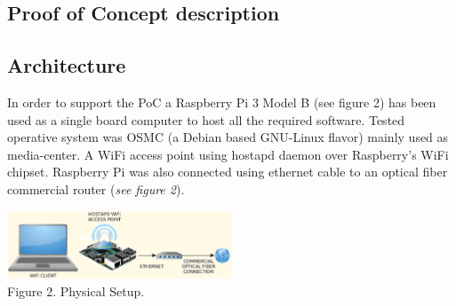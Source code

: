 \documentclass[12pt]{amsart}
\begin{document}
\begin{multicols}{2}



\section{Proof of Concept description}

\subsection{Architecture}
\label{ch:architecture}
\vspace{0.35cm}

In order to support the PoC a
Raspberry Pi 3 Model B (see figure 2) has been used
as a single board computer to host all the required software.
Tested operative system was OSMC\cite{osmc} (a Debian based
GNU-Linux flavor) mainly used as media-center.
A WiFi access point using
hostapd\cite{hostapd} daemon over Raspberry's WiFi chipset.
Raspberry Pi was also connected using ethernet cable
to an optical fiber commercial router (\textit{see figure 2}).

\begin{center}
  \includegraphics[keepaspectratio, width=0.5\textwidth]{images/physical-setup-y.eps}
\\
Figure 2. Physical Setup.
\\

\vspace{0.35cm}


\end{center}
\end{multicols}
\end{document}
